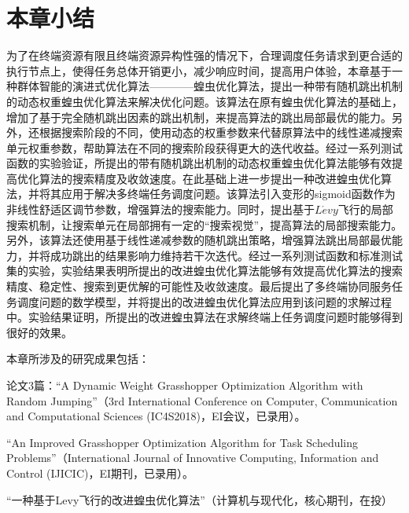 \section{本章小结}\label{sec:task_scheduling_summary}

为了在终端资源有限且终端资源异构性强的情况下，合理调度任务请求到更合适的执行节点上，使得任务总体开销更小，减少响应时间，提高用户体验，本章基于一种群体智能的演进式优化算法————蝗虫优化算法，提出一种带有随机跳出机制的动态权重蝗虫优化算法来解决优化问题。该算法在原有蝗虫优化算法的基础上，增加了基于完全随机跳出因素的跳出机制，来提高算法的跳出局部最优的能力。另外，还根据搜索阶段的不同，使用动态的权重参数来代替原算法中的线性递减搜索单元权重参数，帮助算法在不同的搜索阶段获得更大的迭代收益。经过一系列测试函数的实验验证，所提出的带有随机跳出机制的动态权重蝗虫优化算法能够有效提高优化算法的搜索精度及收敛速度。在此基础上进一步提出一种改进蝗虫优化算法，并将其应用于解决多终端任务调度问题。该算法引入变形的sigmoid函数作为非线性舒适区调节参数，增强算法的搜索能力。同时，提出基于$L\acute{e}vy$飞行的局部搜索机制，让搜索单元在局部拥有一定的“搜索视觉”，提高算法的局部搜索能力。另外，该算法还使用基于线性递减参数的随机跳出策略，增强算法跳出局部最优能力，并将成功跳出的结果影响力维持若干次迭代。经过一系列测试函数和标准测试集的实验，实验结果表明所提出的改进蝗虫优化算法能够有效提高优化算法的搜索精度、稳定性、搜索到更优解的可能性及收敛速度。最后提出了多终端协同服务任务调度问题的数学模型，并将提出的改进蝗虫优化算法应用到该问题的求解过程中。实验结果证明，所提出的改进蝗虫算法在求解终端上任务调度问题时能够得到很好的效果。

本章所涉及的研究成果包括：

论文3篇：“A Dynamic Weight Grasshopper Optimization Algorithm with Random Jumping”（3rd International Conference on Computer, Communication and Computational Sciences (IC4S2018)，EI会议，已录用）。

“An Improved Grasshopper Optimization Algorithm for Task Scheduling Problems”（International Journal of Innovative Computing, Information and Control (IJICIC)，EI期刊，已录用）。


“一种基于Levy飞行的改进蝗虫优化算法”（计算机与现代化，核心期刊，在投）